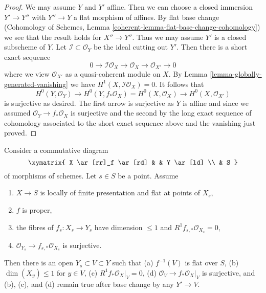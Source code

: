 \begin{proof}
We may assume $Y$ and $Y'$ affine. Then we can choose a closed
immersion $Y' \to Y''$ with $Y'' \to Y$ a flat morphism of affines.
By flat base change
(Cohomology of Schemes, Lemma \ref{coherent-lemma-flat-base-change-cohomology})
we see that the result holds for $X'' \to Y''$.
Thus we may assume $Y'$ is a closed subscheme of $Y$.
Let $\mathcal{I} \subset \mathcal{O}_Y$ be the ideal cutting out $Y'$.
Then there is a short exact sequence
$$
0 \to \mathcal{I}\mathcal{O}_X \to
\mathcal{O}_X \to \mathcal{O}_{X'} \to 0
$$
where we view $\mathcal{O}_{X'}$ as a quasi-coherent module on $X$.
By Lemma \ref{lemma-globally-generated-vanishing}
we have $H^1(X, \mathcal{I}\mathcal{O}_X) = 0$.
It follows that
$$
H^0(Y, \mathcal{O}_Y) \to
H^0(Y, f_*\mathcal{O}_X) = H^0(X, \mathcal{O}_X) \to
H^0(X, \mathcal{O}_{X'})
$$
is surjective as desired. The first arrow is surjective as $Y$
is affine and since we assumed $\mathcal{O}_Y \to f_*\mathcal{O}_X$
is surjective and the second by the long exact sequence of
cohomology associated to the short exact sequence above and
the vanishing just proved.
\end{proof}

\begin{lemma}
\label{lemma-h1-fibre-zero-h0-kappa}
Consider a commutative diagram
$$
\xymatrix{
X \ar[rr]_f \ar[rd] & & Y \ar[ld] \\
& S
}
$$
of morphisms of schemes. Let $s \in S$ be a point. Assume
\begin{enumerate}
\item $X \to S$ is locally of finite presentation and flat at
points of $X_s$,
\item $f$ is proper,
\item the fibres of $f_s : X_s \to Y_s$ have dimension $\leq 1$
and $R^1f_{s, *}\mathcal{O}_{X_s} = 0$,
\item $\mathcal{O}_{Y_s} \to f_{s, *}\mathcal{O}_{X_s}$ is surjective.
\end{enumerate}
Then there is an open $Y_s \subset V \subset Y$ such that
(a) $f^{-1}(V)$ is flat over $S$,
(b) $\dim(X_y) \leq 1$ for $y \in V$,
(c) $R^1f_*\mathcal{O}_X|_V = 0$,
(d) $\mathcal{O}_V \to f_*\mathcal{O}_X|_V$
is surjective,
and (b), (c), and (d) remain true after base change by any $Y' \to V$.
\end{lemma}


